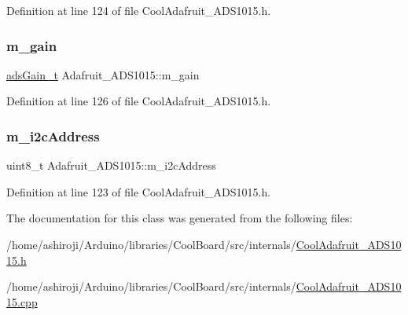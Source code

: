 Definition at line 124 of file Cool\+Adafruit\+\_\+\+A\+D\+S1015.\+h.

\mbox{\label{class_adafruit___a_d_s1015_a8db90fe03d55a18246984ba2ba5e7f32}} 
\subsubsection{\texorpdfstring{m\+\_\+gain}{m\_gain}}
{\footnotesize\ttfamily \hyperlink{_cool_adafruit___a_d_s1015_8h_a3d6c0e15829a207b9155890811fa4781}{ads\+Gain\+\_\+t} Adafruit\+\_\+\+A\+D\+S1015\+::m\+\_\+gain\hspace{0.3cm}{\ttfamily [protected]}}



Definition at line 126 of file Cool\+Adafruit\+\_\+\+A\+D\+S1015.\+h.

\mbox{\label{class_adafruit___a_d_s1015_a2186993621a7973256d47f086c74035d}} 
\subsubsection{\texorpdfstring{m\+\_\+i2c\+Address}{m\_i2cAddress}}
{\footnotesize\ttfamily uint8\+\_\+t Adafruit\+\_\+\+A\+D\+S1015\+::m\+\_\+i2c\+Address\hspace{0.3cm}{\ttfamily [protected]}}



Definition at line 123 of file Cool\+Adafruit\+\_\+\+A\+D\+S1015.\+h.



The documentation for this class was generated from the following files\+:\begin{DoxyCompactItemize}
\item 
/home/ashiroji/\+Arduino/libraries/\+Cool\+Board/src/internals/\hyperlink{_cool_adafruit___a_d_s1015_8h}{Cool\+Adafruit\+\_\+\+A\+D\+S1015.\+h}\item 
/home/ashiroji/\+Arduino/libraries/\+Cool\+Board/src/internals/\hyperlink{_cool_adafruit___a_d_s1015_8cpp}{Cool\+Adafruit\+\_\+\+A\+D\+S1015.\+cpp}\end{DoxyCompactItemize}
